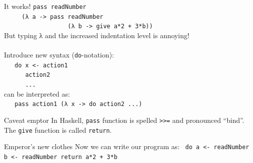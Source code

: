 \documentclass{beamer}
\begin{document}
\begin{frame}{It works!}
  \texttt{pass readNumber \\
    \ \ \ \ \ (λ a -> pass readNumber \\
    \ \ \ \ \ \ \ \ \ \ \ \ \ \ \ \ \ \ (λ b -> give a*2 + 3*b))
  } \\ \pause
  But typing λ and the increased indentation level is annoying! \\ \pause
  \ \\ Introduce new syntax (\texttt{do}-notation): \\
  \texttt{
    \ \ do x <- action1 \\
    \ \ \ \ \ \ action2 \\
    \ \ \ \ \ \ ...
  } \ \\ \pause
  can be interpreted as: \\ \pause
  \texttt{
    \ \ pass action1 (λ x -> do action2 ...)
  }
\end{frame}

\begin{frame}{Caveat emptor}
  In Haskell, \texttt{pass} function is spelled \texttt{>>=} and pronounced ``bind''.
  The \texttt{give} function is called \texttt{return}.
\end{frame}


\begin{frame}{Emperor's new clothes}
  Now we can write our program as:
  \texttt{
    do a <- readNumber
       b <- readNumber
       return a*2 + 3*b
  }
\end{frame}
\end{document}
